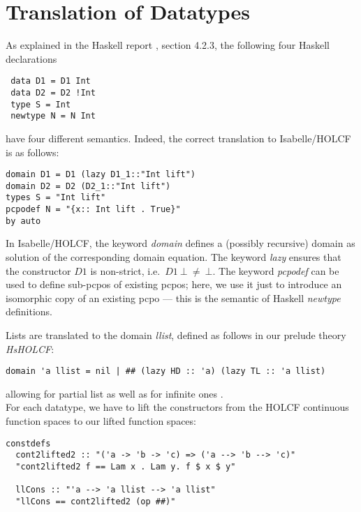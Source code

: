 \documentclass{llncs}
\begin{document}
\section{Translation of Datatypes}

As explained in the Haskell report \cite{HaskellRep}, section 4.2.3,
the following four Haskell declarations

\begin{verbatim}
 data D1 = D1 Int
 data D2 = D2 !Int
 type S = Int
 newtype N = N Int
\end{verbatim}

have four different semantics. Indeed, the correct translation to
Isabelle/HOLCF is as follows:

\begin{verbatim}
domain D1 = D1 (lazy D1_1::"Int lift")
domain D2 = D2 (D2_1::"Int lift")
types S = "Int lift"
pcpodef N = "{x:: Int lift . True}"
by auto
\end{verbatim}
\noindent In Isabelle/HOLCF, the keyword \emph{domain} defines a
(possibly recursive) domain as solution of the corresponding domain
equation.  The keyword \emph{lazy} ensures that the constructor $D1$
is non-strict, i.e.\ $D1 \ \bot \ \neq \ \bot$.  The keyword
\emph{pcpodef} can be used to define sub-pcpos of existing pcpos;
here, we use it just to introduce an isomorphic copy of an existing
pcpo --- this is the semantic of Haskell \emph{newtype} definitions.


Lists are translated to the domain \emph{llist}, defined as follows 
in our prelude theory \emph{HsHOLCF}:

\begin{verbatim}
domain 'a llist = nil | ## (lazy HD :: 'a) (lazy TL :: 'a llist) 
\end{verbatim}
\noindent allowing for partial list as well as for infinite ones \cite{holcf}.\\

For each datatype, we have to lift the constructors from the
HOLCF continuous function spaces to our lifted function spaces:

\begin{verbatim}
constdefs
  cont2lifted2 :: "('a -> 'b -> 'c) => ('a --> 'b --> 'c)"
  "cont2lifted2 f == Lam x . Lam y. f $ x $ y"

  llCons :: "'a --> 'a llist --> 'a llist"
  "llCons == cont2lifted2 (op ##)"
\end{verbatim}
\end{document}
